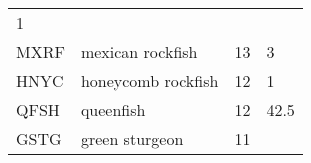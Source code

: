 \documentclass[]{article}
\begin{document}
\begin{longtable}[c]{@{}llll@{}}
\begin{minipage}[t]{0.23\columnwidth}
1
\end{minipage}
\\\addlinespace
\begin{minipage}[t]{0.08\columnwidth}\raggedright
MXRF
\end{minipage} & \begin{minipage}[t]{0.36\columnwidth}\raggedright
mexican rockfish
\end{minipage} & \begin{minipage}[t]{0.21\columnwidth}\raggedright
13
\end{minipage} & \begin{minipage}[t]{0.23\columnwidth}\raggedright
3
\end{minipage}
\\\addlinespace
\begin{minipage}[t]{0.08\columnwidth}\raggedright
HNYC
\end{minipage} & \begin{minipage}[t]{0.36\columnwidth}\raggedright
honeycomb rockfish
\end{minipage} & \begin{minipage}[t]{0.21\columnwidth}\raggedright
12
\end{minipage} & \begin{minipage}[t]{0.23\columnwidth}\raggedright
1
\end{minipage}
\\\addlinespace
\begin{minipage}[t]{0.08\columnwidth}\raggedright
QFSH
\end{minipage} & \begin{minipage}[t]{0.36\columnwidth}\raggedright
queenfish
\end{minipage} & \begin{minipage}[t]{0.21\columnwidth}\raggedright
12
\end{minipage} & \begin{minipage}[t]{0.23\columnwidth}\raggedright
42.5
\end{minipage}
\\\addlinespace
\begin{minipage}[t]{0.08\columnwidth}\raggedright
GSTG
\end{minipage} & \begin{minipage}[t]{0.36\columnwidth}\raggedright
green sturgeon
\end{minipage} & \begin{minipage}[t]{0.21\columnwidth}\raggedright
11
\end{minipage} & \begin{minipage}[t]{0.23\columnwidth}\raggedright

\end{minipage}
\end{longtable}
\end{document}
